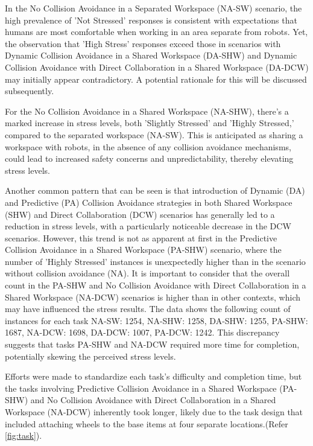 In the No Collision Avoidance in a Separated Workspace (NA-SW) scenario, the high prevalence of 'Not Stressed' responses is consistent with expectations that humans are most comfortable when working in an area separate from robots. Yet, the observation that 'High Stress' responses exceed those in scenarios with Dynamic Collision Avoidance in a Shared Workspace (DA-SHW) and Dynamic Collision Avoidance with Direct Collaboration in a Shared Workspace (DA-DCW) may initially appear contradictory. A potential rationale for this will be discussed subsequently.

For the No Collision Avoidance in a Shared Workspace (NA-SHW), there's a marked increase in stress levels, both 'Slightly Stressed' and 'Highly Stressed,' compared to the separated workspace (NA-SW). This is anticipated as sharing a workspace with robots, in the absence of any collision avoidance mechanisms, could lead to increased safety concerns and unpredictability, thereby elevating stress levels.

Another common pattern that can be seen is that introduction of Dynamic (DA) and Predictive (PA) Collision Avoidance strategies in both Shared Workspace (SHW) and Direct Collaboration (DCW) scenarios has generally led to a reduction in stress levels, with a particularly noticeable decrease in the DCW scenarios. However, this trend is not as apparent at first in the Predictive Collision Avoidance in a Shared Workspace (PA-SHW) scenario, where the number of 'Highly Stressed' instances is unexpectedly higher than in the scenario without collision avoidance (NA). It is important to consider that the overall count in the PA-SHW and No Collision Avoidance with Direct Collaboration in a Shared Workspace (NA-DCW) scenarios is higher than in other contexts, which may have influenced the stress results. The data shows the following count of instances for each task
NA-SW: 1254,
NA-SHW: 1258,
DA-SHW: 1255,
PA-SHW: 1687,
NA-DCW: 1698,
DA-DCW: 1007,
PA-DCW: 1242.
This discrepancy suggests that tasks PA-SHW and NA-DCW required more time for completion, potentially skewing the perceived stress levels.

Efforts were made to standardize each task's difficulty and completion time, but the tasks involving Predictive Collision Avoidance in a Shared Workspace (PA-SHW) and No Collision Avoidance with Direct Collaboration in a Shared Workspace (NA-DCW) inherently took longer, likely due to the task design that included attaching wheels to the base items at four separate locations.(Refer \autoref{fig:task}). 

